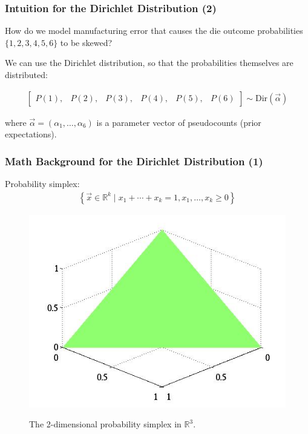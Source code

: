 \documentclass[12pt]{beamer}
\newcommand{\Dir}{\text{Dir}}
\begin{document}
\begin{frame}
    \frametitle{Intuition for the Dirichlet Distribution (2)}

    How do we model manufacturing error that causes
    the die outcome probabilities $\{1, 2, 3, 4, 5, 6\}$
    to be skewed?

    \bigskip

    \pause

    We can use the \alert{Dirichlet} distribution, so that the probabilities
    themselves are distributed:

    \begin{align*}
        \begin{bmatrix}
            P(1),
            &
            P(2),
            &
            P(3),
            &
            P(4),
            &
            P(5),
            &
            P(6)
        \end{bmatrix}
        \sim
        \Dir(\vec{\alpha})
    \end{align*}

    \medskip

    where $\vec{\alpha} = (\alpha_1, \dots, \alpha_6)$ is a parameter vector
    of \alert{pseudocounts} (prior expectations).

\end{frame}
\begin{frame}
    \frametitle{Math Background for the Dirichlet Distribution (1)}

    \alert{Probability simplex:} 
    \begin{align*}
        \left\{\vec{x} \in \mathbb{R}^k \mid x_1 + \cdots + x_k = 1, x_1, \dots,
        x_k \ge 0\right\}
    \end{align*}

    \begin{figure}[!h]
        \includegraphics[width=.5\textwidth]{images/dirichlet_distribution_uniform_one.png}

        {\small The 2-dimensional probability simplex in $\mathbb{R}^3$.}
    \end{figure}


\end{frame}
\end{document}
